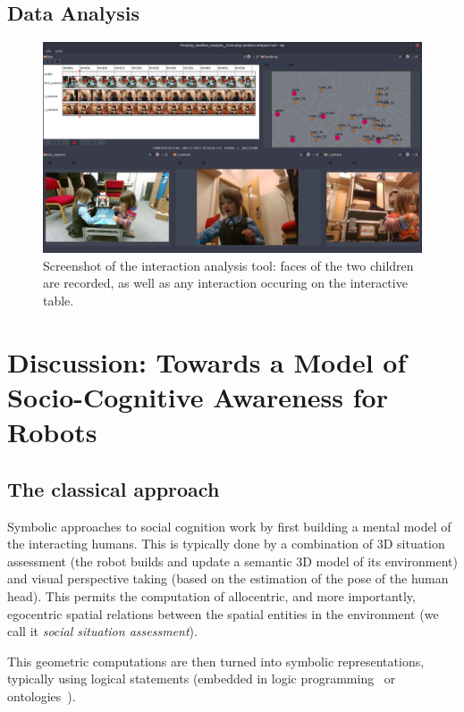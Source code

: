\documentclass[a4paper]{article}
\begin{document}
\subsection{Data Analysis}

\begin{figure}
    \centering
    \includegraphics[width=\linewidth]{analysis}
    \caption{Screenshot of the interaction analysis tool: faces of the two
    children are recorded, as well as any interaction occuring on the
    interactive table.}
    \label{fig|analysis}
\end{figure}

\section{Discussion: Towards a Model of Socio-Cognitive Awareness for Robots}

\subsection{The classical approach}


Symbolic approaches to social cognition work by first building a mental model of the
interacting humans. This is typically done by a combination of 3D situation
assessment (the robot builds and update a semantic 3D model of its environment)
and visual perspective taking (based on the estimation of the pose of the human
head). This permits the computation of allocentric, and more importantly,
egocentric spatial relations between the spatial entities in the environment
(we call it \emph{social situation assessment}).

This geometric computations are then turned into symbolic representations,
typically using logical statements (embedded in logic
programming~\cite{tenorth2009knowrob} or ontologies~\cite{lemaignan2010oro}).
\end{document}

